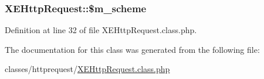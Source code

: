 \subsubsection[{\$m\+\_\+scheme}]{\setlength{\rightskip}{0pt plus 5cm}X\+E\+Http\+Request\+::\$m\+\_\+scheme}\label{classXEHttpRequest_a501919f00934ef2cc76300fa32c2f19d}


Definition at line 32 of file X\+E\+Http\+Request.\+class.\+php.



The documentation for this class was generated from the following file\+:\begin{DoxyCompactItemize}
\item 
classes/httprequest/\hyperlink{XEHttpRequest_8class_8php}{X\+E\+Http\+Request.\+class.\+php}\end{DoxyCompactItemize}
